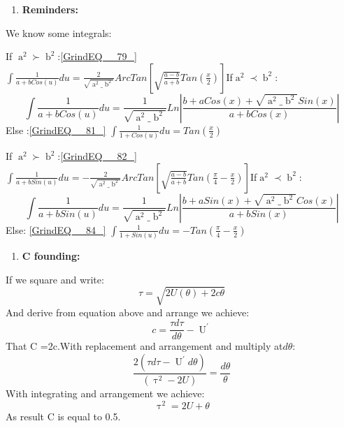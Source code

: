 \documentclass{article}
\begin{document}
\begin{enumerate}
\item  \textbf{Reminders:}
\end{enumerate}

\noindent We know some integrals:

\noindent If $\mathop{a}\nolimits^{2} \succ \mathop{b}\nolimits^{2} $:\eqref{GrindEQ__79_}                         $\int \frac{1}{a+bCos(u)} du =\frac{2}{\sqrt{\mathop{a}\nolimits^{2} \_ \mathop{b}\nolimits^{2} } } ArcTan\left[\sqrt{\frac{a-b}{a+b} } Tan\left(\frac{x}{2} \right)\right]$If$\mathop{a}\nolimits^{2} \prec \mathop{b}\nolimits^{2} $:
\begin{equation} \label{GrindEQ__80_} 
\int \frac{1}{a+bCos(u)} du =\frac{1}{\sqrt{\mathop{a}\nolimits^{2} \_ \mathop{b}\nolimits^{2} } } Ln\left|\frac{b+aCos(x)+\sqrt{\mathop{a}\nolimits^{2} \_ \mathop{b}\nolimits^{2} } Sin(x)}{a+bCos(x)} \right| 
\end{equation} 
Else :\eqref{GrindEQ__81_}                                           $\int \frac{1}{1+Cos(u)} du =Tan(\frac{x}{2} )$

\noindent If   $\mathop{a}\nolimits^{2} \succ \mathop{b}\nolimits^{2} $:\eqref{GrindEQ__82_}                      $\int \frac{1}{a+bSin(u)} du =-\frac{2}{\sqrt{\mathop{a}\nolimits^{2} \_ \mathop{b}\nolimits^{2} } } ArcTan\left[\sqrt{\frac{a-b}{a+b} } Tan\left(\frac{\pi }{4} -\frac{x}{2} \right)\right]$If$\mathop{a}\nolimits^{2} \prec \mathop{b}\nolimits^{2} $:
\begin{equation} \label{GrindEQ__83_} 
\int \frac{1}{a+bSin(u)} du =\frac{1}{\sqrt{\mathop{a}\nolimits^{2} \_ \mathop{b}\nolimits^{2} } } Ln\left|\frac{b+aSin(x)+\sqrt{\mathop{a}\nolimits^{2} \_ \mathop{b}\nolimits^{2} } Cos(x)}{a+bSin(x)} \right| 
\end{equation} 
Else: \eqref{GrindEQ__84_}                            $\int \frac{1}{1+Sin(u)} du =-Tan(\frac{\pi }{4} -\frac{x}{2} )$

\noindent 

\noindent 

\begin{enumerate}
\item  \textbf{C founding:}
\end{enumerate}

\noindent If we square and write:
\[\tau =\sqrt{2U(\theta )+2c\theta } \] 
And derive from equation above and arrange we achieve:
\[c=\frac{\tau d\tau }{d\theta } -\mathop{U}\nolimits^{'} \] 
That C =2c.With replacement and arrangement and multiply at$d\theta $:
\[\frac{2(\tau d\tau -\mathop{U}\nolimits^{'} d\theta )}{(\mathop{\tau (\theta )}\nolimits^{2} -2U)} =\frac{d\theta }{\theta } \] 
With integrating and arrangement we achieve:
\[\mathop{\tau (\tau )}\nolimits^{2} =2U+\theta \] 
As result C is equal to 0.5.       
\end{document}
